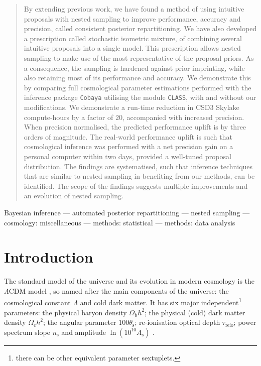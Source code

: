 \documentclass[usenatbib]{mnras}
\begin{document}
\maketitle
\begin{abstract}
  By extending previous work, we have found a method of using
  intuitive proposals with nested sampling to improve performance,
  accuracy and precision, called consistent posterior
  repartitioning. We have also developed a prescription called
  stochastic isometric mixture, of combining several intuitive
  proposals into a single model. This prescription allows nested
  sampling to make use of the most representative of the proposal
  priors. As a consequence, the sampling is hardened against prior
  imprinting, while also retaining most of its performance and
  accuracy. We demonstrate this by comparing full cosmological
  parameter estimations performed with the inference package
  \texttt{Cobaya} utilising the module \texttt{CLASS}, with and
  without our modifications. We demonstrate a run-time reduction in
  CSD3 Skylake compute-hours by a factor of \(20\), accompanied with
  increased precision. When precision normalised, the predicted
  performance uplift is by three orders of magnitude.  The real-world
  performance uplift is such that cosmological inference was performed
  with a net precision gain on a personal computer within two days,
  provided a well-tuned proposal distribution. The findings are
  systematised, such that inference techniques that are similar to
  nested sampling in benefiting from our methods, can be
  identified. The scope of the findings suggests multiple improvements
  and an evolution of nested sampling.
\end{abstract}

\begin{keywords}
Bayesian inference --- automated posterior repartitioning --- nested sampling --- cosmology: miscellaneous --- methods: statistical --- methods: data analysis
\end{keywords}

\section{Introduction}\label{sec:org14413d7}

The standard model of the universe and its evolution in modern
cosmology is the \(\Lambda\)CDM model \citep{Condon2018}, so named
after the main components of the universe: the cosmological constant
\(\Lambda\) and cold dark matter. It has six major
independent\footnote{there can be other equivalent parameter
  sextuplets. } parameters: the physical baryon density
\(\Omega_\mathrm{b}h^{2}\); the physical (cold) dark matter density
\(\Omega_\mathrm{c}h^{2}\); the angular parameter
\(100\theta_\mathrm{s}\); re-ionisation optical depth
\(\tau_\text{reio}\); power spectrum slope \(n_\mathrm{s}\) and
amplitude \(\ln (10^{10}A_\mathrm{s})\) \citep{Cosmology}.
\end{document}
